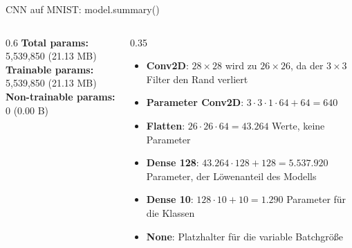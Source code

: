 \begin{frame}[fragile]{CNN auf MNIST: model.summary()}
\begin{columns}
\begin{column}{0.6\textwidth}
{\vspace{0.5em}
\noindent\textbf{Total params:} \textcolor{jupyternum}{5,539,850} (21.13 MB)\\
\textbf{Trainable params:} \textcolor{jupyternum}{5,539,850} (21.13 MB)\\
\textbf{Non-trainable params:} \textcolor{jupyternum}{0} (0.00 B)
}
\end{column}
\begin{column}{0.35\textwidth}
    \footnotesize
\begin{itemize}    
  \item \textbf{Conv2D}: $28 \times 28$ wird zu $26 \times 26$, da der $3 \times 3$ Filter den Rand verliert
  \item \textbf{Parameter Conv2D}: $3 \cdot 3 \cdot 1 \cdot 64 + 64 = 640$
  \item \textbf{Flatten}: $26 \cdot 26 \cdot 64 = 43{.}264$ Werte, keine Parameter
  \item \textbf{Dense 128}: $43{.}264 \cdot 128 + 128 = 5{.}537{.}920$ Parameter, der Löwenanteil des Modells
  \item \textbf{Dense 10}: $128 \cdot 10 + 10 = 1{.}290$ Parameter für die Klassen
  \item \textbf{None}: Platzhalter für die variable Batchgröße
\end{itemize}
\end{column}
\end{columns}
\end{frame}


